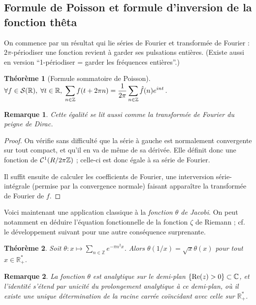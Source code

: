 \documentclass[a4paper, 11pt]{article}
\def\Z{\mathbb{Z}}
\def\R{\mathbb{R}}
\def\C{\mathbb{C}}
\def\S{{\cal{S}}}
\def\Cf{{\cal{C}}}
\def\Re{\textnormal{Re}}
\newtheorem*{theorem}{Théorème}
\newtheorem*{remark}{Remarque}
\begin{document}
\newpage

\subsection{Formule de Poisson et formule d'inversion de la fonction thêta}
\label{poisson}

On commence par un résultat qui lie séries de Fourier et transformée de Fourier :
$2\pi$-périodiser une fonction revient à garder ses pulsations entières. (Existe
aussi en version \enquote{1-périodiser = garder les fréquences entières}.)

\begin{theorem}[Formule sommatoire de Poisson]
  $\displaystyle \forall f \in \S(\R),\; \forall t \in \R,\; \sum_{n \in \Z} f(t
  + 2\pi n) = \frac{1}{2\pi} \sum_{n \in \Z} \hat{f}(n)e^{int}$.
\end{theorem}

\begin{remark}
  Cette égalité se lit aussi comme la transformée de Fourier du peigne de Dirac.
\end{remark}

\begin{proof}
  On vérifie sans difficulté que la série à gauche est normalement convergente
  sur tout compact, et qu'il en va de même de sa dérivée. Elle définit donc une
  fonction de $\Cf^1(R/2\pi\Z)$ ; celle-ci est donc égale à sa série de Fourier.

  Il suffit ensuite de calculer les coefficients de Fourier, une interversion
  série-intégrale (permise par la convergence normale) faisant apparaître la
  transformée de Fourier de $f$.
\end{proof}

Voici maintenant une application classique à la \emph{fonction $\theta$ de
  Jacobi}. On peut notamment en déduire l'équation fonctionnelle de la fonction
$\zeta$ de Riemann ; cf. le développement suivant pour une autre conséquence
surprenante.

\begin{theorem}
  Soit $\theta : x \mapsto \sum_{n \in \Z} e^{-\pi n^2 x}$.
  Alors $\theta(1/x) = \sqrt{x}\theta(x)$ pour tout $x \in \R_+^*$.
\end{theorem}
\begin{remark}
  La fonction $\theta$ est analytique sur le demi-plan $\{\Re(z) > 0\}
  \subset \C$, et l'identité s'étend par unicité du prolongement analytique à ce
  demi-plan, où il existe une unique détermination de la racine carrée
  coïncidant avec celle sur $\R^*_+$.
\end{remark}
\end{document}
